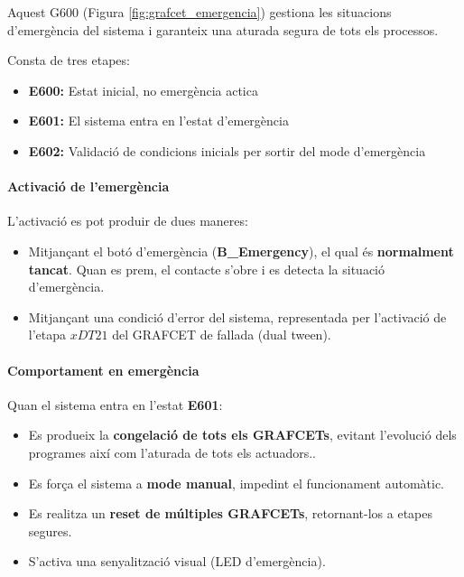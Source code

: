 \documentclass[12pt,a4paper]{report}
\begin{document}
Aquest G600 (Figura \ref{fig:grafcet_emergencia}) gestiona les situacions d'emergència del sistema i garanteix una aturada segura de tots els processos.

Consta de tres etapes:

\begin{itemize}
\item \textbf{E600:} Estat inicial, no emergència actica
\item \textbf{E601:} El sistema entra en l'estat d'emergència
\item \textbf{E602:} Validació de condicions inicials per sortir del mode d'emergència
\end{itemize}

\paragraph{Activació de l'emergència}

L'activació es pot produir de dues maneres:

\begin{itemize}
\item Mitjançant el botó d'emergència (\textbf{B\_Emergency}), el qual és \textbf{normalment tancat}. Quan es prem, el contacte s'obre i es detecta la situació d'emergència.
\item Mitjançant una condició d'error del sistema, representada per l'activació de l'etapa $xDT21$ del GRAFCET de fallada (dual tween).
\end{itemize}

\paragraph{Comportament en emergència}

Quan el sistema entra en l'estat \textbf{E601}:

\begin{itemize}
\item Es produeix la \textbf{congelació de tots els GRAFCETs}, evitant l'evolució dels programes així com l'aturada de tots els actuadors..
\item Es força el sistema a \textbf{mode manual}, impedint el funcionament automàtic.
\item Es realitza un \textbf{reset de múltiples GRAFCETs}, retornant-los a etapes segures.
\item S'activa una senyalització visual (LED d'emergència).
\end{itemize}
\end{document}
